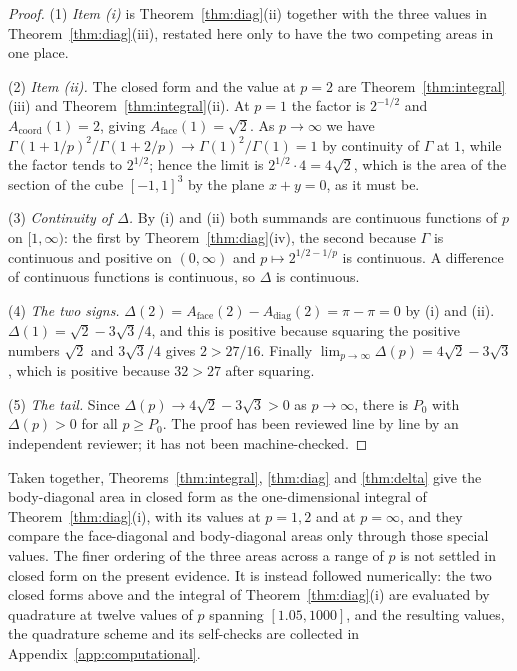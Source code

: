 \documentclass[11pt]{article}
\theoremstyle{plain}
\numberwithin{theorem}{section}
\begin{document}
\begin{proof}
(1) \emph{Item (i)} is Theorem~\ref{thm:diag}(ii) together with the three values in Theorem~\ref{thm:diag}(iii), restated here only to have the two competing areas in one place.

(2) \emph{Item (ii).} The closed form and the value at $p=2$ are Theorem~\ref{thm:integral}(iii) and Theorem~\ref{thm:integral}(ii). At $p=1$ the factor is $2^{-1/2}$ and $A_{\mathrm{coord}}(1)=2$, giving $A_{\mathrm{face}}(1)=\sqrt2$. As $p\to\infty$ we have $\Gamma(1+1/p)^2/\Gamma(1+2/p)\to\Gamma(1)^2/\Gamma(1)=1$ by continuity of $\Gamma$ at $1$, while the factor tends to $2^{1/2}$; hence the limit is $2^{1/2}\cdot4=4\sqrt2$, which is the area of the section of the cube $[-1,1]^3$ by the plane $x+y=0$, as it must be.

(3) \emph{Continuity of $\Delta$.} By (i) and (ii) both summands are continuous functions of $p$ on $[1,\infty)$: the first by Theorem~\ref{thm:diag}(iv), the second because $\Gamma$ is continuous and positive on $(0,\infty)$ and $p\mapsto2^{1/2-1/p}$ is continuous. A difference of continuous functions is continuous, so $\Delta$ is continuous.

(4) \emph{The two signs.} $\Delta(2)=A_{\mathrm{face}}(2)-A_{\mathrm{diag}}(2)=\pi-\pi=0$ by (i) and (ii). $\Delta(1)=\sqrt2-3\sqrt3/4$, and this is positive because squaring the positive numbers $\sqrt2$ and $3\sqrt3/4$ gives $2>27/16$. Finally $\lim_{p\to\infty}\Delta(p)=4\sqrt2-3\sqrt3$, which is positive because $32>27$ after squaring.

(5) \emph{The tail.} Since $\Delta(p)\to4\sqrt2-3\sqrt3>0$ as $p\to\infty$, there is $P_0$ with $\Delta(p)>0$ for all $p\ge P_0$. The proof has been reviewed line by line by an independent reviewer; it has not been machine-checked.
\end{proof}

Taken together, Theorems~\ref{thm:integral}, \ref{thm:diag} and \ref{thm:delta} give the body-diagonal area in closed form as the one-dimensional integral of Theorem~\ref{thm:diag}(i), with its values at $p=1,2$ and at $p=\infty$, and they compare the face-diagonal and body-diagonal areas only through those special values. The finer ordering of the three areas across a range of $p$ is not settled in closed form on the present evidence. It is instead followed numerically: the two closed forms above and the integral of Theorem~\ref{thm:diag}(i) are evaluated by quadrature at twelve values of $p$ spanning $[1.05,1000]$, and the resulting values, the quadrature scheme and its self-checks are collected in Appendix~\ref{app:computational}.
\end{document}

